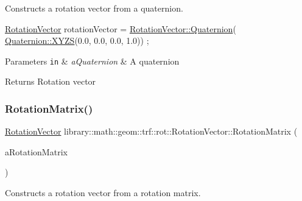 Constructs a rotation vector from a quaternion. 


\begin{DoxyCode}
\hyperlink{classlibrary_1_1math_1_1geom_1_1trf_1_1rot_1_1_rotation_vector_a32b1fab5e81bc24d777324daf5849205}{RotationVector} rotationVector = \hyperlink{classlibrary_1_1math_1_1geom_1_1trf_1_1rot_1_1_rotation_vector_a63ba12aac718671383516a0adab25aec}{RotationVector::Quaternion}(
      \hyperlink{classlibrary_1_1math_1_1geom_1_1trf_1_1rot_1_1_quaternion_afff9523c7dcbfbbc521736121e62ad41}{Quaternion::XYZS}(0.0, 0.0, 0.0, 1.0)) ;
\end{DoxyCode}



\begin{DoxyParams}[1]{Parameters}
\mbox{\tt in}  & {\em a\+Quaternion} & A quaternion \\
\hline
\end{DoxyParams}
\begin{DoxyReturn}{Returns}
Rotation vector 
\end{DoxyReturn}
\mbox{\label{classlibrary_1_1math_1_1geom_1_1trf_1_1rot_1_1_rotation_vector_a87fd9cff1e806199ed150569a6e98889}} 
\subsubsection{\texorpdfstring{Rotation\+Matrix()}{RotationMatrix()}}
{\footnotesize\ttfamily \hyperlink{classlibrary_1_1math_1_1geom_1_1trf_1_1rot_1_1_rotation_vector}{Rotation\+Vector} library\+::math\+::geom\+::trf\+::rot\+::\+Rotation\+Vector\+::\+Rotation\+Matrix (\begin{DoxyParamCaption}\item[{const \hyperlink{classlibrary_1_1math_1_1geom_1_1trf_1_1rot_1_1_rotation_matrix}{rot\+::\+Rotation\+Matrix} \&}]{a\+Rotation\+Matrix }\end{DoxyParamCaption})\hspace{0.3cm}{\ttfamily [static]}}



Constructs a rotation vector from a rotation matrix. 


